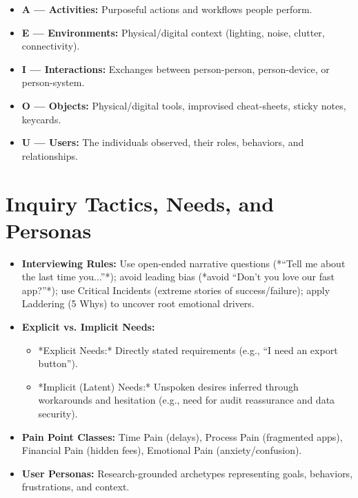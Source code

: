 \begin{formulabox}
\begin{itemize}[leftmargin=1.2em, itemsep=2pt]
    \item \textbf{A --- Activities:} Purposeful actions and workflows people perform.
    \item \textbf{E --- Environments:} Physical/digital context (lighting, noise, clutter, connectivity).
    \item \textbf{I --- Interactions:} Exchanges between person-person, person-device, or person-system.
    \item \textbf{O --- Objects:} Physical/digital tools, improvised cheat-sheets, sticky notes, keycards.
    \item \textbf{U --- Users:} The individuals observed, their roles, behaviors, and relationships.
\end{itemize}
\end{formulabox}

\section{Inquiry Tactics, Needs, and Personas}

\begin{itemize}[leftmargin=1.2em, itemsep=3pt]
    \item \textbf{Interviewing Rules:} Use open-ended narrative questions (*``Tell me about the last time you...''*); avoid leading bias (*avoid ``Don't you love our fast app?''*); use Critical Incidents (extreme stories of success/failure); apply Laddering (5 Whys) to uncover root emotional drivers.
    \item \textbf{Explicit vs. Implicit Needs:}
    \begin{itemize}
        \item *Explicit Needs:* Directly stated requirements (e.g., ``I need an export button'').
        \item *Implicit (Latent) Needs:* Unspoken desires inferred through workarounds and hesitation (e.g., need for audit reassurance and data security).
    \end{itemize}
    \item \textbf{Pain Point Classes:} Time Pain (delays), Process Pain (fragmented apps), Financial Pain (hidden fees), Emotional Pain (anxiety/confusion).
    \item \textbf{User Personas:} Research-grounded archetypes representing goals, behaviors, frustrations, and context.
\end{itemize}

